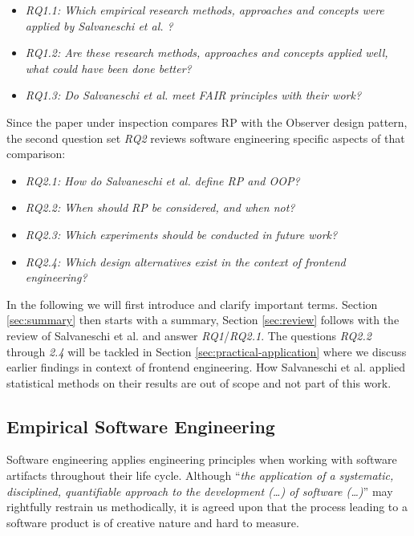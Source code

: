 \documentclass[12pt,a4paper]{article}
\begin{document}
\begin{itemize}
	\item \emph{RQ1.1: Which empirical research methods, approaches and concepts were applied by Salvaneschi et al. \cite{7827078}?}
	\item \emph{RQ1.2: Are these research methods, approaches and concepts applied well, what could have been done better?}
	\item \emph{RQ1.3: Do Salvaneschi et al. \cite{7827078} meet FAIR principles \cite{2019arXiv190805986H} \cite{wilkinson:2016} with their work?}
\end{itemize}

Since the paper under inspection compares RP with the Observer design pattern, the second question set \emph{RQ2} reviews software engineering specific aspects of that comparison:

\begin{itemize}
	\item \emph{RQ2.1: How do Salvaneschi et al. \cite{7827078} define RP and OOP?}
	\item \emph{RQ2.2: When should RP be considered, and when not?}
	\item \emph{RQ2.3: Which experiments should be conducted in future work?}
	\item \emph{RQ2.4: Which design alternatives exist in the context of frontend engineering?}
\end{itemize}

In the following we will first introduce and clarify important terms. Section \ref{sec:summary} then starts with a summary, Section \ref{sec:review} follows with the review of Salvaneschi et al. and answer \emph{RQ1}/\emph{RQ2.1}. The questions \emph{RQ2.2} through \emph{2.4} will be tackled in Section \ref{sec:practical-application} where we discuss earlier findings in context of frontend engineering. How Salvaneschi et al. applied statistical methods on their results are out of scope and not part of this work.

\subsection{Empirical Software Engineering}

Software engineering applies engineering principles when working with software artifacts \cite{159342} throughout their life cycle. Although ``\emph{the application of a systematic, disciplined, quantifiable approach to the development (\dots) of software (\dots)}'' \cite{159342} may rightfully restrain us methodically, it is agreed upon that the process leading to a software product is of creative nature \cite{8051350} and hard to measure.
\end{document}
